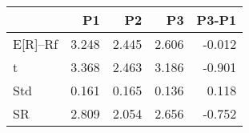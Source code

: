 \begin{tabular}{lrrrr}
\toprule
 & P1 & P2 & P3 & P3-P1 \\
\midrule
E[R]--Rf & 3.248 & 2.445 & 2.606 & -0.012 \\
t & 3.368 & 2.463 & 3.186 & -0.901 \\
Std & 0.161 & 0.165 & 0.136 & 0.118 \\
SR & 2.809 & 2.054 & 2.656 & -0.752 \\
\bottomrule
\end{tabular}
